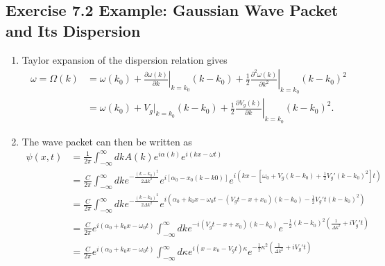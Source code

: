 \documentclass[../main.tex]{subfiles}
\begin{document}
\subsection{Exercise 7.2 Example: Gaussian Wave Packet and Its Dispersion}
\begin{enumerate}[label=(\alph*)]
\item Taylor expansion of the dispersion relation gives
\begin{align}
    \omega=\Omega(k)&=\omega(k_0)+\left.\frac{\partial \omega(k)}{\partial k}\right|_{k=k_0}(k-k_0)+\frac{1}{2}\left.\frac{\partial^2\omega(k)}{\partial k^2}\right|_{k=k_0}(k-k_0)^2\\
    &=\omega(k_0)+V_g|_{k=k_0}(k-k_0)+\frac{1}{2}\left.\frac{\partial V_g(k)}{\partial k}\right|_{k=k_0}(k-k_0)^2.
\end{align}
\item The wave packet can then be written as
\begin{align}
   \psi(x,t)
   &=\frac{1}{2\pi}\int_{-\infty}^\infty dk A(k)e^{i\alpha(k)}e^{i(kx-\omega t)}\\
   &=\frac{C}{2\pi}\int_{-\infty}^\infty dk e^{-\frac{(k-k_0)^2}{2\Delta k^2}}e^{i[\alpha_0-x_0(k-k0)]}e^{i(kx-[\omega_0+V_g(k-k_0)+\frac{1}{2}V_g'(k-k_0)^2] t)}\\
   &=\frac{C}{2\pi}\int_{-\infty}^\infty dk e^{-\frac{(k-k_0)^2}{2\Delta k^2}}e^{i(\alpha_0+k_0x-\omega_0t-(V_gt-x+x_0)(k-k_0)-\frac{1}{2}V_g't (k-k_0)^2)}\\
   &=\frac{C}{2\pi}e^{i(\alpha_0+k_0x-\omega_0t)}\int_{-\infty}^\infty dk e^{-i(V_gt-x+x_0)(k-k_0)} e^{-\frac{1}{2}(k-k_0)^2\left(\frac{1}{\Delta k^2}+iV_g't\right)}\\
   &=\frac{C}{2\pi}e^{i(\alpha_0+k_0x-\omega_0t)}\int_{-\infty}^\infty d\kappa e^{i(x-x_0-V_gt)\kappa} e^{-\frac{1}{2}\kappa^2\left(\frac{1}{\Delta k^2}+iV_g't\right)}\\
\end{align}


\end{enumerate}
\end{document}
